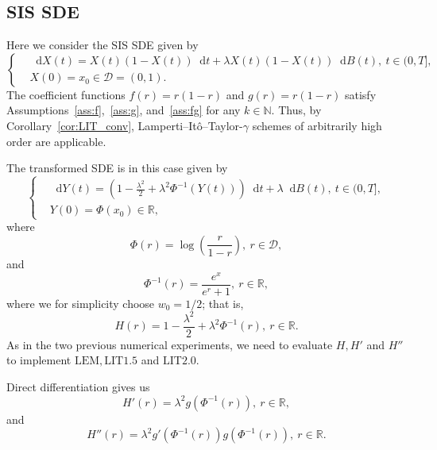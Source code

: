 \documentclass[11pt]{amsart}
\newcommand*\diff{\mathop{}\!\mathrm{d}}
\newcommand{\D}{\mathcal{D}}
\newcommand{\LIT}{\textrm{LIT}}
\newcommand{\LEM}{\textrm{LEM}}
\begin{document}
{\subsection{SIS SDE}
Here we consider the SIS SDE given by
\begin{equation}\label{eq:SIS_SDE}
\left\lbrace
\begin{aligned}
& \diff X(t) = X(t) \left( 1 - X(t) \right) \diff t + \lambda X(t) \left( 1 - X(t) \right) \diff B(t),\ t \in (0,T], \\ 
& X(0) = x_{0} \in \D = (0,1).
\end{aligned}
\right.
\end{equation}
The coefficient functions $f(r) = r(1-r)$ and $g(r) = r(1-r)$ satisfy Assumptions~\ref{ass:f},~\ref{ass:g}, and~\ref{ass:fg} for any $k \in \mathbb{N}$. Thus, by Corollary~\ref{cor:LIT_conv}, Lamperti--Itô--Taylor-$\gamma$ schemes of arbitrarily high order are applicable.

The transformed SDE is in this case given by
\begin{equation*}
\left\lbrace
\begin{aligned}
& \diff Y(t) = \left(1 - \frac{\lambda^{2}}{2} + \lambda^{2} \Phi^{-1}(Y(t)) \right) \diff t + \lambda \diff B(t),\ t \in (0,T], \\ 
& Y(0) = \Phi(x_{0}) \in \mathbb{R},
\end{aligned}
\right.
\end{equation*}
where
\begin{equation*}
\Phi(r) = \log \left( \frac{r}{1-r} \right),\ r \in \D,
\end{equation*}
and
\begin{equation*}
\Phi^{-1}(r) = \frac{e^{x}}{e^{r} + 1},\ r \in \mathbb{R},
\end{equation*}
where we for simplicity choose $w_{0}=1/2$; that is,
\begin{equation*}
H(r) = 1 - \frac{\lambda^{2}}{2} + \lambda^{2} \Phi^{-1}(r),\ r \in \mathbb{R}.
\end{equation*}
As in the two previous numerical experiments, we need to evaluate $H,H'$ and $H''$ to implement $\LEM, \LIT 1.5$ and $\LIT 2.0$.

Direct differentiation gives us
\begin{equation*}
H'(r) = \lambda^{2} g(\Phi^{-1}(r)),\ r \in \mathbb{R},
\end{equation*}
and
\begin{equation*}
H''(r) = \lambda^{2} g'(\Phi^{-1}(r)) g(\Phi^{-1}(r)),\ r \in \mathbb{R}.
\end{equation*}

}
\end{document}
